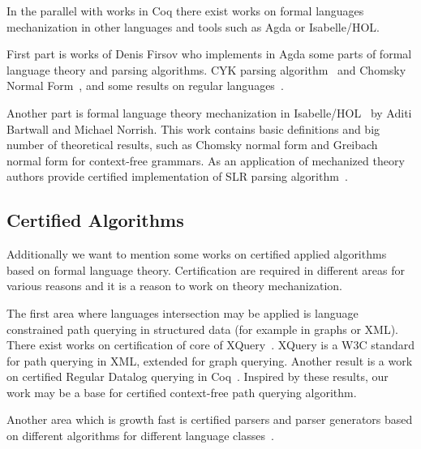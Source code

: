 In the parallel with works in Coq there exist works on formal languages mechanization in other languages and tools such as Agda or Isabelle/HOL.

First part is works of Denis Firsov who implements in Agda some parts of formal language theory and parsing algorithms.
CYK parsing algorithm~\cite{firsov2014certified,firsov2016cfl} and Chomsky Normal Form~\cite{firsov2015certified}, and some results on regular languages~\cite{10.1007/978-3-319-03545-1_7}.

Another part is formal language theory mechanization in Isabelle/HOL~\cite{1885-16399,barthwal2010formalisation,10.1007/978-3-642-13824-9_11} by Aditi Bartwall and Michael Norrish.
This work contains basic definitions and big number of theoretical results, such as Chomsky normal form and Greibach normal form for context-free grammars. 
As an application of mechanized theory authors provide certified implementation of SLR parsing algorithm~\cite{10.1007/978-3-642-00590-9_12}.

\subsection{Certified Algorithms}

Additionally we want to mention some works on certified applied algorithms based on formal language theory.
Certification are required in different areas for various reasons and it is a reason to work on theory mechanization.

The first area where languages intersection may be applied is language constrained path querying in structured data (for example in graphs or XML).
There exist works on certification of core of XQuery~\cite{10.1007/978-3-642-25379-9_21}. 
XQuery is a W3C standard for path querying in XML, extended for graph querying. 
Another result is a work on certified Regular Datalog querying in Coq~\cite{certifiedPrologGraphQuerying}. 
Inspired by these results, our work may be a base for certified context-free path querying algorithm.

Another area which is growth fast is certified parsers and parser generators based on different algorithms for different language classes~\cite{10.1007/978-3-642-28869-2_20,bernardy2016certified,Lopes2016CertifiedDP,Gross2015ParsingPA}. 
